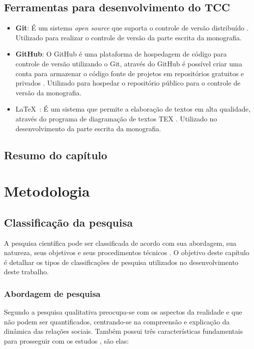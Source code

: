 \section{Ferramentas para desenvolvimento do TCC}
\label{sec:ferramentasDesenvolvimento}

\begin{itemize}
	\item \textbf{Git}: É um sistema \textit{open source} que suporta o controle de versão distribuído \cite{git}. Utilizado para realizar o controle de versão da parte escrita da monografia. 
	\item \textbf{GitHub}: O GitHub é uma plataforma de hospedagem de código para controle de versão utilizando o Git, através do GitHub é possível criar uma conta para armazenar o código fonte de projetos em repositórios gratuitos e privados \cite{github}. Utilizado para hospedar o repositório público para o controle de versão da monografia. 
	\item \LaTeX\ : É um sistema que permite a elaboração de textos em alta qualidade, através do programa de diagramação de textos TEX \cite{latex}. Utilizado no desenvolvimento da parte escrita da monografia. 
\end{itemize}

\section{Resumo do capítulo}

\chapter{Metodologia}

\section{Classificação da pesquisa}

A pesquisa científica pode ser classificada de acordo com sua abordagem, sua natureza, seus objetivos e seus procedimentos técnicos \cite{gerhardt2009metodos}. O objetivo deste capítulo é detalhar os tipos de classificações de pesquisa utilizados no desenvolvimento deste trabalho. 

\subsection{Abordagem de pesquisa}

Segundo \cite{gerhardt2009metodos} a pesquisa qualitativa preocupa-se com os aspectos da realidade e que não podem ser quantificados, centrando-se na compreensão e explicação da dinâmica das relações sociais. Também possui três características fundamentais para prosseguir com os estudos \cite{mazzotti1991planejamento}, são elas:

